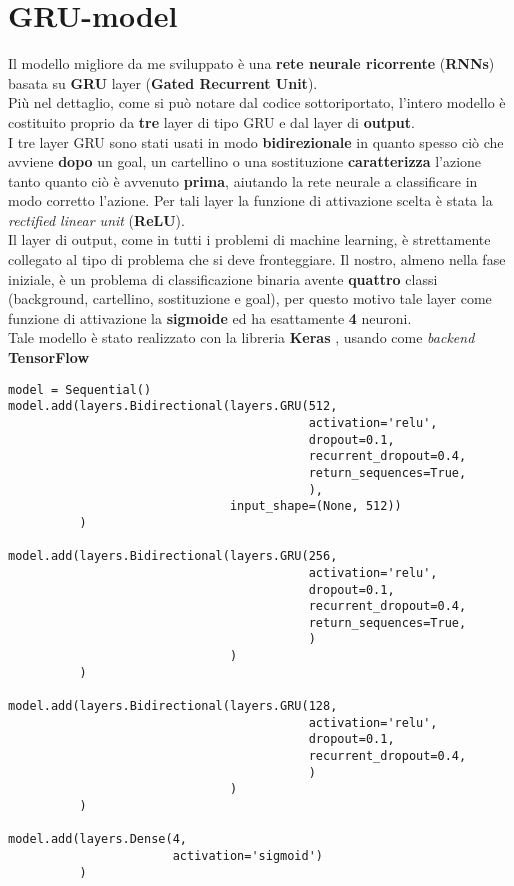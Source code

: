 \section{GRU-model}
\label{section : grumodel}
Il modello migliore da me sviluppato è una \textbf{rete neurale ricorrente} (\textbf{RNNs}) basata su \textbf{GRU} layer (\textbf{Gated Recurrent Unit}). 
\\Più nel dettaglio, come si può notare dal codice sottoriportato, l'intero modello è costituito proprio da \textbf{tre} layer di tipo GRU e dal layer di \textbf{output}.
\\I tre layer GRU sono stati usati in modo \textbf{bidirezionale} in quanto spesso ciò che avviene \textbf{dopo} un goal, un cartellino o una sostituzione \textbf{caratterizza} l'azione tanto quanto ciò è avvenuto \textbf{prima}, aiutando la rete neurale a classificare in modo corretto l'azione. Per tali layer la funzione di attivazione scelta è stata la \textit{rectified linear unit} (\textbf{ReLU}). \cite{DeepLearningPython}
\\Il layer di output, come in tutti i problemi di machine learning, è strettamente collegato al tipo di problema che si deve fronteggiare. Il nostro, almeno nella fase iniziale, è un problema di classificazione binaria avente \textbf{quattro} classi (background, cartellino, sostituzione e goal), per questo motivo tale layer come funzione di attivazione la \textbf{sigmoide} ed ha esattamente \textbf{4} neuroni.
\\Tale modello è stato realizzato con la libreria \textbf{Keras} \cite{chollet2015keras}, usando come \textit{backend} \textbf{TensorFlow} \cite{tensorflow2015-whitepaper}
\begin{verbatim}
model = Sequential()
model.add(layers.Bidirectional(layers.GRU(512,
                                          activation='relu',
                                          dropout=0.1,
                                          recurrent_dropout=0.4,
                                          return_sequences=True,
                                          ),
                               input_shape=(None, 512))
          )

model.add(layers.Bidirectional(layers.GRU(256,
                                          activation='relu',
                                          dropout=0.1,
                                          recurrent_dropout=0.4,
                                          return_sequences=True,
                                          )
                               )
          )

model.add(layers.Bidirectional(layers.GRU(128,
                                          activation='relu',
                                          dropout=0.1,
                                          recurrent_dropout=0.4,
                                          )
                               )
          )

model.add(layers.Dense(4,
                       activation='sigmoid')
          )
\end{verbatim}
